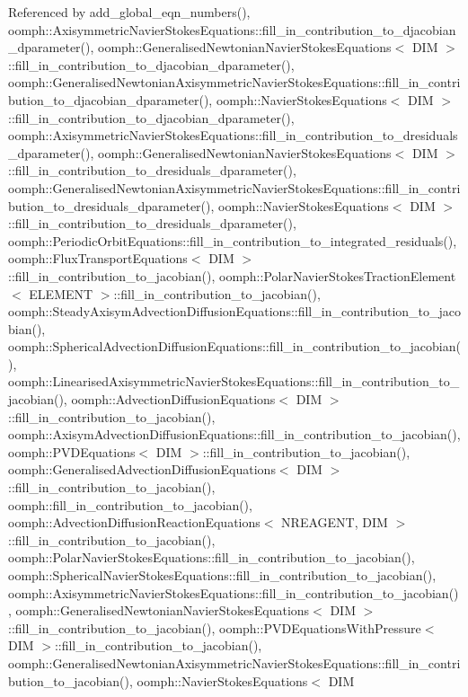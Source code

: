Referenced by add\+\_\+global\+\_\+eqn\+\_\+numbers(), oomph\+::\+Axisymmetric\+Navier\+Stokes\+Equations\+::fill\+\_\+in\+\_\+contribution\+\_\+to\+\_\+djacobian\+\_\+dparameter(), oomph\+::\+Generalised\+Newtonian\+Navier\+Stokes\+Equations$<$ D\+I\+M $>$\+::fill\+\_\+in\+\_\+contribution\+\_\+to\+\_\+djacobian\+\_\+dparameter(), oomph\+::\+Generalised\+Newtonian\+Axisymmetric\+Navier\+Stokes\+Equations\+::fill\+\_\+in\+\_\+contribution\+\_\+to\+\_\+djacobian\+\_\+dparameter(), oomph\+::\+Navier\+Stokes\+Equations$<$ D\+I\+M $>$\+::fill\+\_\+in\+\_\+contribution\+\_\+to\+\_\+djacobian\+\_\+dparameter(), oomph\+::\+Axisymmetric\+Navier\+Stokes\+Equations\+::fill\+\_\+in\+\_\+contribution\+\_\+to\+\_\+dresiduals\+\_\+dparameter(), oomph\+::\+Generalised\+Newtonian\+Navier\+Stokes\+Equations$<$ D\+I\+M $>$\+::fill\+\_\+in\+\_\+contribution\+\_\+to\+\_\+dresiduals\+\_\+dparameter(), oomph\+::\+Generalised\+Newtonian\+Axisymmetric\+Navier\+Stokes\+Equations\+::fill\+\_\+in\+\_\+contribution\+\_\+to\+\_\+dresiduals\+\_\+dparameter(), oomph\+::\+Navier\+Stokes\+Equations$<$ D\+I\+M $>$\+::fill\+\_\+in\+\_\+contribution\+\_\+to\+\_\+dresiduals\+\_\+dparameter(), oomph\+::\+Periodic\+Orbit\+Equations\+::fill\+\_\+in\+\_\+contribution\+\_\+to\+\_\+integrated\+\_\+residuals(), oomph\+::\+Flux\+Transport\+Equations$<$ D\+I\+M $>$\+::fill\+\_\+in\+\_\+contribution\+\_\+to\+\_\+jacobian(), oomph\+::\+Polar\+Navier\+Stokes\+Traction\+Element$<$ E\+L\+E\+M\+E\+N\+T $>$\+::fill\+\_\+in\+\_\+contribution\+\_\+to\+\_\+jacobian(), oomph\+::\+Steady\+Axisym\+Advection\+Diffusion\+Equations\+::fill\+\_\+in\+\_\+contribution\+\_\+to\+\_\+jacobian(), oomph\+::\+Spherical\+Advection\+Diffusion\+Equations\+::fill\+\_\+in\+\_\+contribution\+\_\+to\+\_\+jacobian(), oomph\+::\+Linearised\+Axisymmetric\+Navier\+Stokes\+Equations\+::fill\+\_\+in\+\_\+contribution\+\_\+to\+\_\+jacobian(), oomph\+::\+Advection\+Diffusion\+Equations$<$ D\+I\+M $>$\+::fill\+\_\+in\+\_\+contribution\+\_\+to\+\_\+jacobian(), oomph\+::\+Axisym\+Advection\+Diffusion\+Equations\+::fill\+\_\+in\+\_\+contribution\+\_\+to\+\_\+jacobian(), oomph\+::\+P\+V\+D\+Equations$<$ D\+I\+M $>$\+::fill\+\_\+in\+\_\+contribution\+\_\+to\+\_\+jacobian(), oomph\+::\+Generalised\+Advection\+Diffusion\+Equations$<$ D\+I\+M $>$\+::fill\+\_\+in\+\_\+contribution\+\_\+to\+\_\+jacobian(), oomph\+::fill\+\_\+in\+\_\+contribution\+\_\+to\+\_\+jacobian(), oomph\+::\+Advection\+Diffusion\+Reaction\+Equations$<$ N\+R\+E\+A\+G\+E\+N\+T, D\+I\+M $>$\+::fill\+\_\+in\+\_\+contribution\+\_\+to\+\_\+jacobian(), oomph\+::\+Polar\+Navier\+Stokes\+Equations\+::fill\+\_\+in\+\_\+contribution\+\_\+to\+\_\+jacobian(), oomph\+::\+Spherical\+Navier\+Stokes\+Equations\+::fill\+\_\+in\+\_\+contribution\+\_\+to\+\_\+jacobian(), oomph\+::\+Axisymmetric\+Navier\+Stokes\+Equations\+::fill\+\_\+in\+\_\+contribution\+\_\+to\+\_\+jacobian(), oomph\+::\+Generalised\+Newtonian\+Navier\+Stokes\+Equations$<$ D\+I\+M $>$\+::fill\+\_\+in\+\_\+contribution\+\_\+to\+\_\+jacobian(), oomph\+::\+P\+V\+D\+Equations\+With\+Pressure$<$ D\+I\+M $>$\+::fill\+\_\+in\+\_\+contribution\+\_\+to\+\_\+jacobian(), oomph\+::\+Generalised\+Newtonian\+Axisymmetric\+Navier\+Stokes\+Equations\+::fill\+\_\+in\+\_\+contribution\+\_\+to\+\_\+jacobian(), oomph\+::\+Navier\+Stokes\+Equations$<$ D\+I\+M 